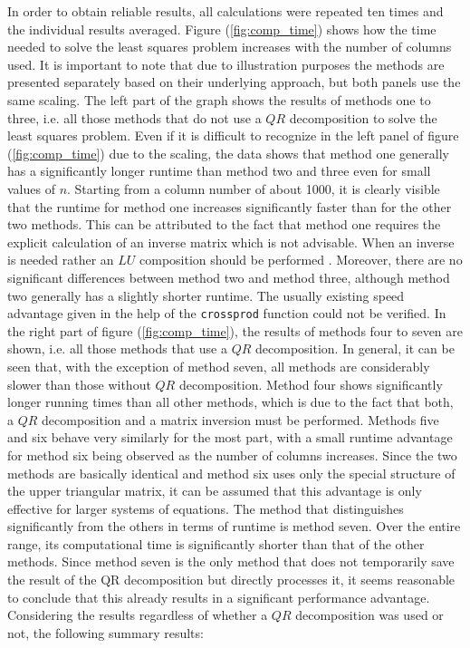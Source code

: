 In order to obtain reliable results, all calculations were repeated ten times and the individual results averaged. Figure (\ref{fig:comp_time}) shows how the time needed to solve the least squares problem increases with the number of columns used. It is important to note that due to illustration purposes the methods are presented separately based on their underlying approach, but both panels use the same scaling. The left part of the graph shows the results of methods one to three, i.e. all those methods that do not use a $QR$ decomposition to solve the least squares problem. Even if it is difficult to recognize in the left panel of figure (\ref{fig:comp_time}) due to the scaling, the data shows that method one generally has a significantly longer runtime than method two and three even for small values of $n$. Starting from a column number of about 1000, it is clearly visible that the runtime for method one increases significantly faster than for the other two methods. This can be attributed to the fact that method one requires the explicit calculation of an inverse matrix which is not advisable.  When an inverse is needed rather an $LU$ composition should be performed \cite{lund1978hct}. Moreover, there are no significant differences between method two and method three, although method two generally has a slightly shorter runtime. The usually existing speed advantage given in the help of the \texttt{crossprod} function could not be verified. In the right part of figure (\ref{fig:comp_time}), the results of methods four to seven are shown, i.e. all those methods that use a $QR$ decomposition. In general, it can be seen that, with the exception of method seven, all methods are considerably slower than those without $QR$ decomposition. Method four shows significantly longer running times than all other methods, which is due to the fact that both, a $QR$ decomposition and a matrix inversion must be performed. Methods five and six behave very similarly for the most part, with a small runtime advantage for method six being observed as the number of columns increases. Since the two methods are basically identical and method six uses only the special structure of the upper triangular matrix, it can be assumed that this advantage is only effective for larger systems of equations. The method that distinguishes significantly from the others in terms of runtime is method seven. Over the entire range, its computational time is significantly shorter than that of the other methods. Since method seven is the only method that does not temporarily save the result of the QR decomposition but directly processes it, it seems reasonable to conclude that this already results in a significant performance advantage. Considering the results regardless of whether a $QR$ decomposition was used or not, the following summary results:

